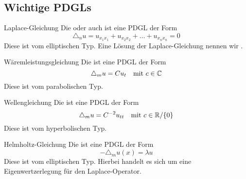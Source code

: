 \subsection{Wichtige PDGLs}
    \begin{Def}{Laplace-Gleichung}
    Die  oder auch  ist eine PDGL der Form
    $$\triangle_n u = u_{x_1x_1}+u_{x_2x_2}+\dots + u_{x_nx_n}=0$$
    Diese ist vom elliptischen Typ. Eine Lösung der Laplace-Gleichung nennen wir 
.        
    \end{Def}
    \begin{Def}{Wäremleistungsgleichung}
      Die  ist eine PDGL der Form
      $$\triangle_m u=Cu_t\quad \mbox{mit $c\in \mathbb{C}$}$$
      Diese ist vom parabolischen Typ.
    \end{Def}
\begin{Def}{Wellengleichung}
      Die  ist eine PDGL der Form
      $$\triangle_m u=C^{-2}u_{tt}\quad \mbox{mit $c\in \mathbb{R}/\{0\}$}$$
      Diese ist vom hyperbolischen Typ.
    \end{Def}
\begin{Def}{Helmholtz-Gleichung}
      Die  ist eine PDGL der Form
      $$-\triangle_m u(x)=\lambda u$$
      Diese ist vom elliptischen Typ. Hierbei handelt es sich um eine Eigenwertzerlegung für den Laplace-Operator.
    \end{Def}
